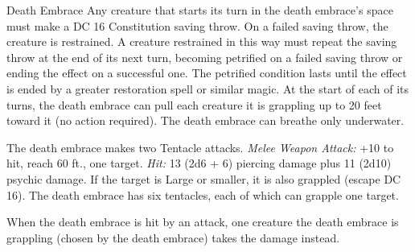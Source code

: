 \documentclass[10pt,a4paper,twoside,twocolumn,openany,bg=none,nodeprecatedcode]{dndbook}
\begin{document}
\begin{DndMonster}[float*=t]{Death Embrace}
\DndMonsterBasics[
armor-class = {13 (natural armor)},
hit-points = {\DndDice{14d12 + 56}},
speed = {0 ft., 20 ft. (key)}
]
\DndMonsterAbilityScores[
 str = 23,
 dex = 15,
 con = 19,
 int = 6,
 wis = 9,
 cha = 4
]
\DndMonsterDetails[
saving-throws = {Str +10, Wis +3},
senses = {blindsight 60 ft. (blind beyond this radius), passive perception 9},
challenge = 11,
]
Any creature that starts its turn in the death embrace's space must make a DC 16 Constitution saving throw. On a failed saving throw, the creature is restrained. A creature restrained in this way must repeat the saving throw at the end of its next turn, becoming petrified on a failed saving throw or ending the effect on a successful one. The petrified condition lasts until the effect is ended by a greater restoration spell or similar magic.
At the start of each of its turns, the death embrace can pull each creature it is grappling up to 20 feet toward it (no action required).
The death embrace can breathe only underwater.
\par
{}
The death embrace makes two Tentacle attacks.
\textsl{Melee Weapon Attack:} +10 to hit, reach 60 ft., one target. \textsl{Hit:} 13 (2d6 + 6) piercing damage plus 11 (2d10) psychic damage. If the target is Large or smaller, it is also grappled (escape DC 16). The death embrace has six tentacles, each of which can grapple one target.
\par
{}
When the death embrace is hit by an attack, one creature the death embrace is grappling (chosen by the death embrace) takes the damage instead.
\end{DndMonster}
\end{document}
